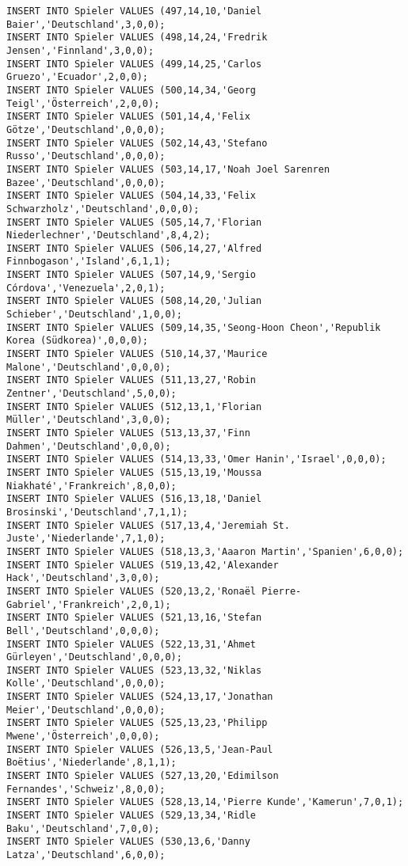 \documentclass{lehramt-informatik-aufgabe}
\begin{document}
\begin{verbatim}
INSERT INTO Spieler VALUES (497,14,10,'Daniel Baier','Deutschland',3,0,0);
INSERT INTO Spieler VALUES (498,14,24,'Fredrik Jensen','Finnland',3,0,0);
INSERT INTO Spieler VALUES (499,14,25,'Carlos Gruezo','Ecuador',2,0,0);
INSERT INTO Spieler VALUES (500,14,34,'Georg Teigl','Österreich',2,0,0);
INSERT INTO Spieler VALUES (501,14,4,'Felix Götze','Deutschland',0,0,0);
INSERT INTO Spieler VALUES (502,14,43,'Stefano Russo','Deutschland',0,0,0);
INSERT INTO Spieler VALUES (503,14,17,'Noah Joel Sarenren Bazee','Deutschland',0,0,0);
INSERT INTO Spieler VALUES (504,14,33,'Felix Schwarzholz','Deutschland',0,0,0);
INSERT INTO Spieler VALUES (505,14,7,'Florian Niederlechner','Deutschland',8,4,2);
INSERT INTO Spieler VALUES (506,14,27,'Alfred Finnbogason','Island',6,1,1);
INSERT INTO Spieler VALUES (507,14,9,'Sergio Córdova','Venezuela',2,0,1);
INSERT INTO Spieler VALUES (508,14,20,'Julian Schieber','Deutschland',1,0,0);
INSERT INTO Spieler VALUES (509,14,35,'Seong-Hoon Cheon','Republik Korea (Südkorea)',0,0,0);
INSERT INTO Spieler VALUES (510,14,37,'Maurice Malone','Deutschland',0,0,0);
INSERT INTO Spieler VALUES (511,13,27,'Robin Zentner','Deutschland',5,0,0);
INSERT INTO Spieler VALUES (512,13,1,'Florian Müller','Deutschland',3,0,0);
INSERT INTO Spieler VALUES (513,13,37,'Finn Dahmen','Deutschland',0,0,0);
INSERT INTO Spieler VALUES (514,13,33,'Omer Hanin','Israel',0,0,0);
INSERT INTO Spieler VALUES (515,13,19,'Moussa Niakhaté','Frankreich',8,0,0);
INSERT INTO Spieler VALUES (516,13,18,'Daniel Brosinski','Deutschland',7,1,1);
INSERT INTO Spieler VALUES (517,13,4,'Jeremiah St. Juste','Niederlande',7,1,0);
INSERT INTO Spieler VALUES (518,13,3,'Aaaron Martin','Spanien',6,0,0);
INSERT INTO Spieler VALUES (519,13,42,'Alexander Hack','Deutschland',3,0,0);
INSERT INTO Spieler VALUES (520,13,2,'Ronaël Pierre-Gabriel','Frankreich',2,0,1);
INSERT INTO Spieler VALUES (521,13,16,'Stefan Bell','Deutschland',0,0,0);
INSERT INTO Spieler VALUES (522,13,31,'Ahmet Gürleyen','Deutschland',0,0,0);
INSERT INTO Spieler VALUES (523,13,32,'Niklas Kolle','Deutschland',0,0,0);
INSERT INTO Spieler VALUES (524,13,17,'Jonathan Meier','Deutschland',0,0,0);
INSERT INTO Spieler VALUES (525,13,23,'Philipp Mwene','Österreich',0,0,0);
INSERT INTO Spieler VALUES (526,13,5,'Jean-Paul Boëtius','Niederlande',8,1,1);
INSERT INTO Spieler VALUES (527,13,20,'Edimilson Fernandes','Schweiz',8,0,0);
INSERT INTO Spieler VALUES (528,13,14,'Pierre Kunde','Kamerun',7,0,1);
INSERT INTO Spieler VALUES (529,13,34,'Ridle Baku','Deutschland',7,0,0);
INSERT INTO Spieler VALUES (530,13,6,'Danny Latza','Deutschland',6,0,0);

\end{verbatim}
\end{document}
